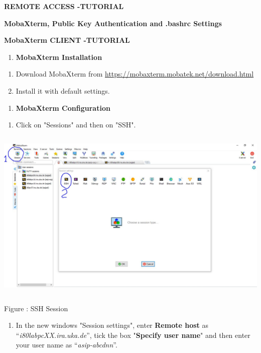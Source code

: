 \documentclass[
]{article}
\author{}
\date{}
\begin{document}
\textbf{REMOTE ACCESS -TUTORIAL}

\textbf{MobaXterm, Public Key Authentication and .bashrc Settings}

\textbf{MobaXterm CLIENT -TUTORIAL}

\begin{enumerate}
\def\labelenumi{\Alph{enumi}.}
\item
  \textbf{MobaXterm Installation}
\end{enumerate}

\begin{enumerate}
\def\labelenumi{\arabic{enumi}.}
\item
  Download MobaXterm from
  \url{https://mobaxterm.mobatek.net/download.html}
\item
  Install it with default settings.
\end{enumerate}

\begin{enumerate}
\def\labelenumi{\Alph{enumi}.}
\setcounter{enumi}{1}
\item
  \textbf{MobaXterm Configuration}
\end{enumerate}

\begin{enumerate}
\def\labelenumi{\arabic{enumi}.}
\setcounter{enumi}{2}
\item
  Click on "Sessions" and then on "SSH".
\end{enumerate}

\includegraphics[width=5.73515in,height=3.25226in]{images/media/image1.JPG}

Figure : SSH Session

\begin{enumerate}
\def\labelenumi{\arabic{enumi}.}
\setcounter{enumi}{3}
\item
  In the new windows "Session settings", enter \textbf{Remote host} as
  ``\emph{i80labpcXX.ira.uka.de}'', tick the box "\textbf{Specify user
  name}" and then enter your user name as ``\emph{asip-abcdnn}''.
\end{enumerate}
\end{document}

